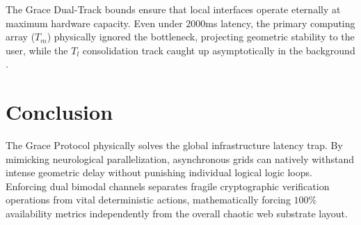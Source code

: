 \documentclass[12pt, a4paper]{article}
\theoremstyle{plain}
\theoremstyle{definition}
\begin{document}
The Grace Dual-Track bounds ensure that local interfaces operate eternally at maximum hardware capacity. Even under $2000$ms latency, the primary computing array ($T_m$) physically ignored the bottleneck, projecting geometric stability to the user, while the $T_l$ consolidation track caught up asymptotically in the background \cite{chandy1985distributed}.

\section{Conclusion}
The Grace Protocol physically solves the global infrastructure latency trap. By mimicking neurological parallelization, asynchronous grids can natively withstand intense geometric delay without punishing individual logical logic loops. Enforcing dual bimodal channels separates fragile cryptographic verification operations from vital deterministic actions, mathematically forcing $100\%$ availability metrics independently from the overall chaotic web substrate layout.





\vspace{3em}
\noindent\hrulefill
\vspace{1em}
\end{document}
